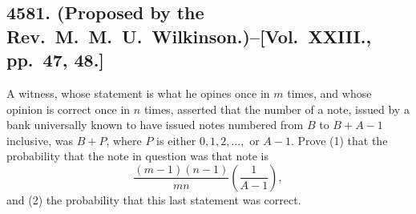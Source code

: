 \documentclass[11pt,a4paper]{article}
\theoremstyle{definition}
\begin{document}
\newpage

\subsection*{4581. (Proposed by the Rev.~M.~M.~U.~Wilkinson.)\---[Vol.~XXIII., pp.~47, 48.]}

A witness, whose statement is what he opines once in $m$ times, and whose opinion is correct once in $n$ times, asserted that the number of a note, issued by a bank universally known to have issued notes numbered from $B$ to $B+A-1$ inclusive, was $B+P$, where $P$ is either $0,1,2,\ldots,$ or $A-1$. Prove (1) that the probability that the note in question was that note is
\[
\frac{(m-1)(n-1)}{mn}\left(\frac{1}{A-1}\right),
\]
and (2) the probability that this last statement was correct.
\end{document}
